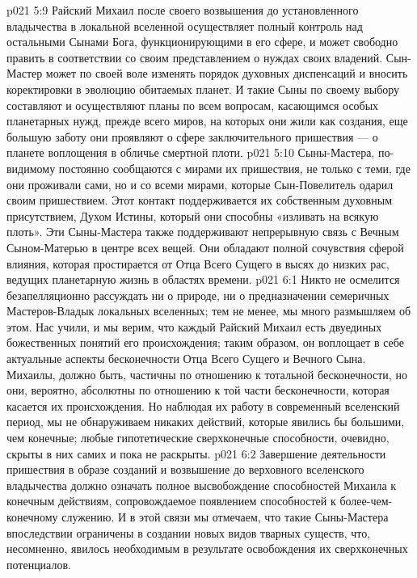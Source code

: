 \vs p021 5:9 Райский Михаил после своего возвышения до установленного владычества в локальной вселенной осуществляет полный контроль над остальными Сынами Бога, функционирующими в его сфере, и может свободно править в соответствии со своим представлением о нуждах своих владений. Сын\hyp{}Мастер может по своей воле изменять порядок духовных диспенсаций и вносить коректировки в эволюцию обитаемых планет. И такие Сыны по своему выбору составляют и осуществляют планы по всем вопросам, касающимся особых планетарных нужд, прежде всего миров, на которых они жили как создания, еще большую заботу они проявляют о сфере заключительного пришествия --- о планете воплощения в обличье смертной плоти.
\vs p021 5:10 Сыны\hyp{}Мастера, по\hyp{}видимому постоянно сообщаются с мирами их пришествия, не только с теми, где они проживали сами, но и со всеми мирами, которые Сын\hyp{}Повелитель одарил своим пришествием. Этот контакт поддерживается их собственным духовным присутствием, Духом Истины, который они способны «изливать на всякую плоть». Эти Сыны\hyp{}Мастера также поддерживают непрерывную связь с Вечным Сыном\hyp{}Матерью в центре всех вещей. Они обладают полной сочувствия сферой влияния, которая простирается от Отца Всего Сущего в высях до низких рас, ведущих планетарную жизнь в областях времени.
\vs p021 6:1 Никто не осмелится безапелляционно рассуждать ни о природе, ни о предназначении семеричных Мастеров\hyp{}Владык локальных вселенных; тем не менее, мы много размышляем об этом. Нас учили, и мы верим, что каждый Райский Михаил есть  двуединых божественных понятий его происхождения; таким образом, он воплощает в себе актуальные аспекты бесконечности Отца Всего Сущего и Вечного Сына. Михаилы, должно быть, частичны по отношению к тотальной бесконечности, но они, вероятно, абсолютны по отношению к той части бесконечности, которая касается их происхождения. Но наблюдая их работу в современный вселенский период, мы не обнаруживаем никаких действий, которые явились бы большими, чем конечные; любые гипотетические сверхконечные способности, очевидно, скрыты в них самих и пока не раскрыты.
\vs p021 6:2 Завершение деятельности пришествия в образе созданий и возвышение до верховного вселенского владычества должно означать полное высвобождение способностей Михаила к конечным действиям, сопровождаемое появлением способностей к более\hyp{}чем\hyp{}конечному служению. И в этой связи мы отмечаем, что такие Сыны\hyp{}Мастера впоследствии ограничены в создании новых видов тварных существ, что, несомненно, явилось необходимым в результате освобождения их сверхконечных потенциалов.
